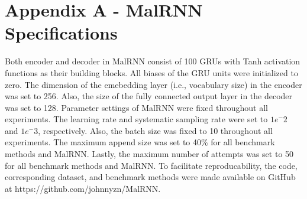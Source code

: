 \documentclass[letterpaper]{article}
\newcommand{\malrnn}{M\lowercase{a}lRNN }
\begin{document}



\appendix
\label{app_A}
\section{Appendix A - MalRNN Specifications}
Both encoder and decoder in MalRNN consist of 100 GRUs with Tanh activation functions as their building blocks. All biases of the GRU units were initialized to zero. The dimension of the emebedding layer (i.e., vocabulary size) in the encoder was set to 256. Also, the size of the fully connected output layer in the decoder was set to 128. Parameter settings of \malrnn were fixed throughout all experiments. The learning rate and systematic sampling rate were set to $1{e^-2}$ and $1{e^-3}$, respectively. Also, the batch size was fixed to 10 throughout all experiments. The maximum append size was set to 40\% for all benchmark methods and MalRNN. Lastly, the maximum number of attempts was set to 50 for all benchmark methods and MalRNN. To facilitate reproducability, the code, corresponding dataset, and benchmark methods were made available on GitHub at  https://github.com/johnnyzn/MalRNN.
\end{document}
